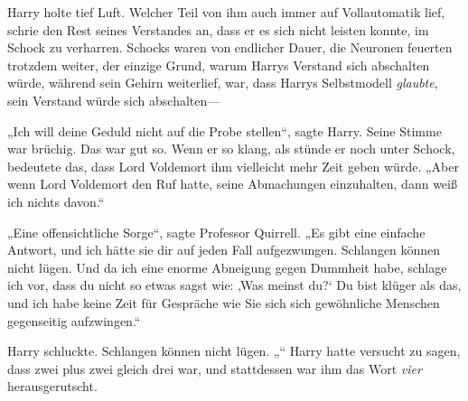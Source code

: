 Harry holte tief Luft. Welcher Teil von ihm auch immer auf Vollautomatik lief, schrie den Rest seines Verstandes an, dass er es sich nicht leisten konnte, im Schock zu verharren. Schocks waren von endlicher Dauer, die Neuronen feuerten trotzdem weiter, der einzige Grund, warum Harrys Verstand sich abschalten würde, während sein Gehirn weiterlief, war, dass Harrys Selbstmodell \emph{glaubte}, sein Verstand würde sich abschalten—

„Ich will deine Geduld nicht auf die Probe stellen“, sagte Harry.
Seine Stimme war brüchig. Das war gut so. Wenn er so klang, als stünde er noch unter Schock, bedeutete das, dass Lord Voldemort ihm vielleicht mehr Zeit geben würde.
„Aber wenn Lord Voldemort den Ruf hatte, seine Abmachungen einzuhalten, dann weiß ich nichts davon.“

„Eine offensichtliche Sorge“, sagte Professor Quirrell. „Es gibt eine einfache Antwort, und ich hätte sie dir auf jeden Fall aufgezwungen. Schlangen können nicht lügen. Und da ich eine enorme Abneigung gegen Dummheit habe, schlage ich vor, dass du nicht so etwas sagst wie: ‚Was meinst du?‘ Du bist klüger als das, und ich habe keine Zeit für Gespräche wie Sie sich sich gewöhnliche Menschen gegenseitig aufzwingen.“

Harry schluckte. Schlangen können nicht lügen. „“
Harry hatte versucht zu sagen, dass zwei plus zwei gleich drei war, und stattdessen war ihm das Wort \emph{vier} herausgerutscht.


